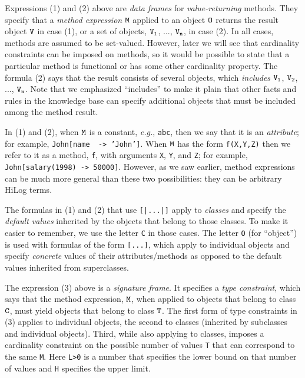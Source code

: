 \documentclass[11pt]{article}
\newcommand{\mvd}{{\mbox{\tt \,->\,}}}  %
\newcommand{\fl}{\mbox{F-logic}\xspace}
\begin{document}
\begin{itemize}
  Expressions (1) and (2) above are \emph{data frames} for
  \emph{value-returning} methods. They specify that a
  \emph{method expression} $\tt M$ applied to an object $\tt O$ returns the
  result object $\tt V$ in case (1), or a set of objects, $\tt V_1$, ...,
  $\tt V_n$, in case (2). In all cases, methods are assumed to be
  set-valued. However, later we will see that cardinality
  constraints can be imposed on methods, so it would be possible to state
  that a particular method is functional or has some other cardinality
  property.
  The formula (2) says that
  the result consists of several objects, which \emph{includes} $\tt V_1$,
  $\tt V_2$, ..., $\tt V_n$. Note that we emphasized ``includes''
  to make it plain that other facts and rules in the knowledge base can specify
  additional objects that must be included among the method result.
  
  In (1) and (2),
  when $\tt M$ is a constant, {\it e.g.}, {\tt abc}, then we say that it is
  an \emph{attribute}; for example, {\tt John[name \mvd 'John']}. When $\tt
  M$ has the form {\tt f(X,Y,Z)} then we refer to it as a method, {\tt f},
  with arguments {\tt X}, {\tt Y}, and {\tt Z}; for example, {\tt
  John[salary(1998)\mvd 50000]}.  However, as we saw
  earlier, method expressions can be much more general than these two
  possibilities: they can be arbitrary HiLog terms.

  The formulas in (1) and (2)
  that use \texttt{[|...|]} apply to \emph{classes} and
  specify the \emph{default values} inherited by the objects that belong to
  those classes. To make it easier to remember, we use the letter
  \texttt{C} in those cases. The letter \texttt{O} (for ``object'') is used
  with formulas of the form \texttt{[...]}, which apply to individual
  objects and
  specify \emph{concrete} values of their attributes/methods as opposed to the
  default values inherited from superclasses.


  \medskip

  \index{signature!in \fl}
  The expression (3) above is a \emph{signature frame}. It specifies a
  \emph{type constraint}, which says
  that the method expression, $\tt M$, when applied to objects that belong
  to class $\tt C$, must yield objects that belong to class $\tt T$.
  The first form of type constraints
  in (3) applies to individual objects, the second to
  classes (inherited by subclasses and individual objects). Third,
  while also applying to classes, imposes a cardinality constraint on the
  possible number of values \texttt{T} that can correspond to the same
  \texttt{M}.  Here \texttt{L>0} is a number that specifies the lower bound
  on that number of values and \texttt{H} specifies the upper limit.


\end{itemize}
\end{document}
